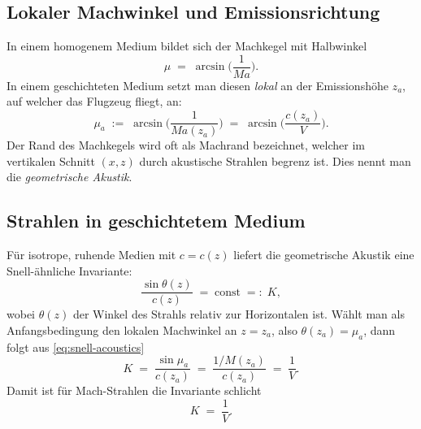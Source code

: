 \subsection{Lokaler Machwinkel und Emissionsrichtung}
In einem homogenem Medium bildet sich der Machkegel mit Halbwinkel
\begin{equation}
    \mu \;=\; \arcsin\!\Big(\frac{1}{Ma}\Big).
\end{equation}
In einem geschichteten Medium setzt man diesen \emph{lokal} an der
Emissionshöhe $z_a$, auf welcher das Flugzeug fliegt, an:
\begin{equation}
    \mu_a \;:=\; \arcsin\!\Big(\frac{1}{Ma(z_a)}\Big)
    \;=\; \arcsin\!\Big(\frac{c(z_a)}{V}\Big) .
    \label{eq:local-mach-angle}
\end{equation}
Der Rand des Machkegels wird oft als Machrand bezeichnet, welcher im
vertikalen Schnitt $(x,z)$ durch akustische Strahlen begrenz ist.
Dies nennt man die \emph{geometrische Akustik}.

\subsection{Strahlen in geschichtetem Medium}
Für isotrope, ruhende Medien mit $c=c(z)$ liefert die geometrische
Akustik eine Snell-ähnliche Invariante:
\begin{equation}
    \frac{\sin\theta(z)}{c(z)} \;=\; \text{const} \;=:\; K ,
    \label{eq:snell-acoustics}
\end{equation}
wobei $\theta(z)$ der Winkel des Strahls relativ zur Horizontalen ist.
Wählt man als Anfangsbedingung den lokalen Machwinkel an $z=z_a$,
also $\theta(z_a)=\mu_a$, dann folgt aus \eqref{eq:snell-acoustics}
\[
    K \;=\; \frac{\sin\mu_a}{c(z_a)} \;=\; \frac{1/M(z_a)}{c(z_a)} \;=\; \frac{1}{V}.
\]
Damit ist für Mach-Strahlen die Invariante schlicht
\begin{equation}
    K \;=\; \frac{1}{V}.
    \label{eq:K-equals-1-over-V}
\end{equation}

